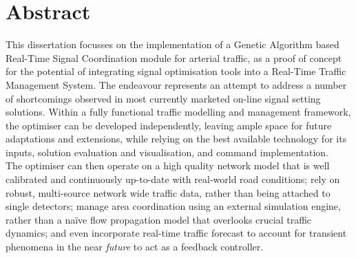\chapter*{Abstract}
This dissertation focusses on the implementation of a Genetic Algorithm based Real-Time Signal Coordination module for arterial traffic, as a proof of concept for the potential of integrating signal optimisation tools into a Real-Time Traffic Management System.
The endeavour represents an attempt to address a number of shortcomings observed in most currently marketed on-line signal setting solutions.
Within a fully functional traffic modelling and management framework, the optimiser can be developed independently, leaving ample space for future adaptations and extensions, while relying on the best available technology for its inputs, solution evaluation and visualisation, and command implementation.\\
The optimiser can then operate on a high quality network model that is well calibrated and continuously up-to-date with real-world road conditions; rely on robust, multi-source network wide traffic data, rather than being attached to single detectors; manage area coordination using an external simulation engine, rather than a na\"ive flow propagation model that overlooks crucial traffic dynamics; and even incorporate real-time traffic forecast to account for transient phenomena in the near \emph{future} to act as a feedback controller. 

